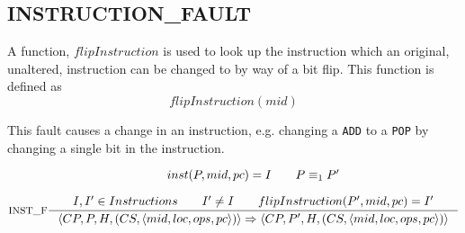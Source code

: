 \subsection{INSTRUCTION\_FAULT}
A function, $flipInstruction$ is used to look up the instruction which an original, unaltered, instruction can be changed to by way of a bit flip. This function is defined as
$$flipInstruction(mid)$$



This fault causes a change in an instruction, e.g. changing a \texttt{ADD} to a \texttt{POP} by changing a single bit in the instruction.

$$\inference[INST\_F]{
inst(P,mid, pc) = I \semsp
P \equiv_1 P' \semnl \\
I,I' \in Instructions \semsp
I' \neq I \semsp
flipInstruction(P',mid, pc) = I'
}
{\langle CP, P, H, (CS, \langle mid, loc, ops, pc \rangle) \rangle \Rightarrow \langle CP, P', H, (CS, \langle mid, loc, ops, pc \rangle)\rangle }$$
